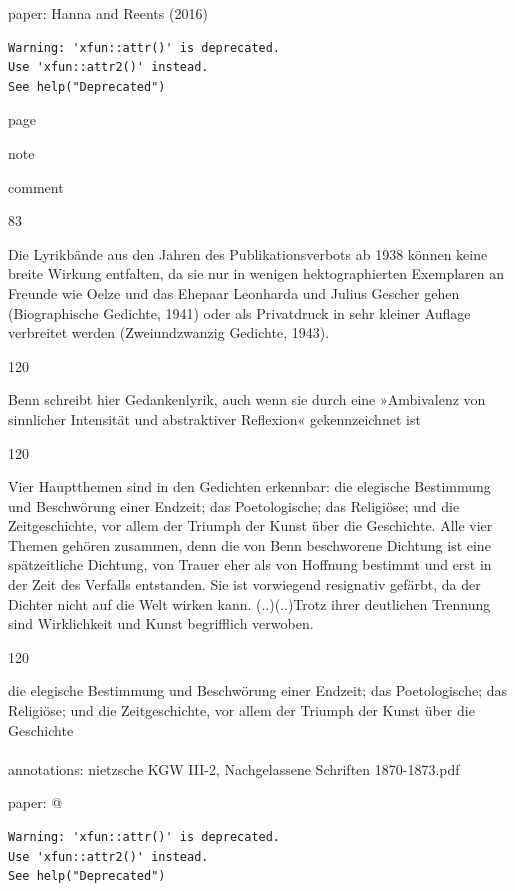 \documentclass[
  letterpaper,
  DIV=11,
  numbers=noendperiod]{scrartcl}
\makeatletter
\let\oldparagraph\paragraph
\renewcommand{\paragraph}{
    \@ifstar
      \xxxParagraphStar
      \xxxParagraphNoStar
  }
\newcommand{\xxxParagraphStar}[1]{\oldparagraph*{#1}\mbox{}}
\newcommand{\xxxParagraphNoStar}[1]{\oldparagraph{#1}\mbox{}}
\makeatother
\begin{document}
paper: Hanna and Reents (2016)

\begin{verbatim}
Warning: 'xfun::attr()' is deprecated.
Use 'xfun::attr2()' instead.
See help("Deprecated")
\end{verbatim}

page

note

comment

83

Die Lyrikbände aus den Jahren des Publikationsverbots ab 1938 können
keine breite Wirkung entfalten, da sie nur in wenigen hektographierten
Exemplaren an Freunde wie Oelze und das Ehepaar Leonharda und Julius
Gescher gehen (Biographische Gedichte, 1941) oder als Privatdruck in
sehr kleiner Auflage verbreitet werden (Zweiundzwanzig Gedichte, 1943).

120

Benn schreibt hier Gedankenlyrik, auch wenn sie durch eine »Ambivalenz
von sinnlicher Intensität und abstraktiver Reflexion« gekennzeichnet ist

120

Vier Hauptthemen sind in den Gedichten erkennbar: die elegische
Bestimmung und Beschwörung einer Endzeit; das Poetologische; das
Religiöse; und die Zeitgeschichte, vor allem der Triumph der Kunst über
die Geschichte. Alle vier Themen gehören zusammen, denn die von Benn
beschworene Dichtung ist eine spätzeitliche Dichtung, von Trauer eher
als von Hoffnung bestimmt und erst in der Zeit des Verfalls entstanden.
Sie ist vorwiegend resignativ gefärbt, da der Dichter nicht auf die Welt
wirken kann. (..)(..)Trotz ihrer deutlichen Trennung sind Wirklichkeit
und Kunst begrifflich verwoben.

120

die elegische Bestimmung und Beschwörung einer Endzeit; das
Poetologische; das Religiöse; und die Zeitgeschichte, vor allem der
Triumph der Kunst über die Geschichte

\paragraph{annotations: nietzsche KGW III-2, Nachgelassene Schriften
1870-1873.pdf}\label{annotations-nietzsche-kgw-iii-2-nachgelassene-schriften-1870-1873.pdf}

paper: @

\begin{verbatim}
Warning: 'xfun::attr()' is deprecated.
Use 'xfun::attr2()' instead.
See help("Deprecated")
\end{verbatim}
\end{document}
